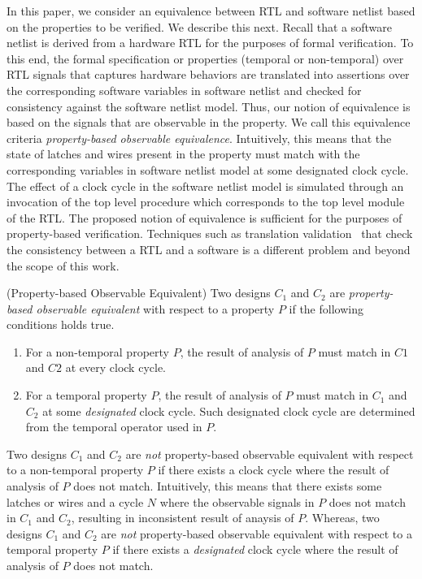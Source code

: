 In this paper, we consider an equivalence between RTL and software netlist 
based on the properties to be verified.  We describe this next.
% 
%
Recall that a software netlist is derived from a hardware RTL for the
purposes of formal verification.  To this end, the formal specification or 
properties (temporal or non-temporal) over RTL signals that captures hardware behaviors 
are translated into assertions over the corresponding software variables in 
software netlist and checked for consistency against the software
netlist model.  Thus, our notion of equivalence is based on the signals 
that are observable in the property.  We call this equivalence criteria 
\emph{property-based observable equivalence}.  
Intuitively, this means that the state of latches and wires 
present in the property must match with the corresponding variables in software 
netlist model at some designated clock cycle.  The effect of a clock cycle 
in the software netlist model is simulated through an invocation of the top 
level procedure which corresponds to the top level module of the RTL. The 
proposed notion of equivalence is sufficient for the purposes of property-based 
verification.
Techniques such as translation validation~\cite{} that check the 
consistency between a RTL and a software is a different problem and beyond the scope of this work.
%
\begin{definition} (Property-based Observable Equivalent) 
  Two designs $C_1$ and $C_2$ are \emph{property-based observable equivalent} with
  respect to a property $P$ if the following conditions holds true. 
  \begin{enumerate}
    \item For a non-temporal property $P$, the result of analysis of $P$ must
      match in $C1$ and $C2$ at every clock cycle.  
   \item For a temporal property $P$, the result of analysis of $P$ must 
     match in $C_1$ and $C_2$ at some \emph{designated} clock cycle.  Such
      designated clock cycle are determined from the temporal operator used in $P$. 
  \end{enumerate}
\end{definition}
%
Two designs $C_1$ and $C_2$ are \emph{not} property-based observable equivalent 
with respect to a non-temporal property $P$ if there exists a clock cycle where 
the result of analysis of $P$ does not match.  Intuitively, this means that 
there exists some latches or wires and a cycle $N$ where the observable signals in $P$ 
does not match in $C_1$ and $C_2$, resulting in inconsistent result of anaysis of $P$. 
%
Whereas, two designs $C_1$ and $C_2$ are \emph{not} property-based observable equivalent 
with respect to a temporal property $P$ if there exists a \emph{designated} clock cycle 
where the result of analysis of $P$ does not match. 



